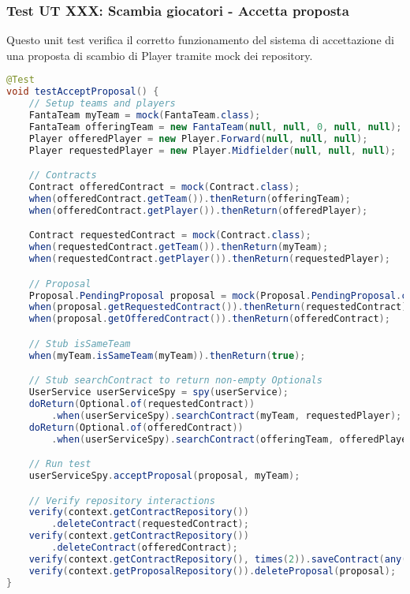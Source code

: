 \subsubsection{Test UT XXX: Scambia giocatori - Accetta proposta} \label{UT13}

Questo unit test verifica il corretto funzionamento del sistema di accettazione di una proposta di scambio di Player 
tramite mock dei repository.

\begin{lstlisting}[language=Java]
@Test
void testAcceptProposal() {
	// Setup teams and players
	FantaTeam myTeam = mock(FantaTeam.class);
	FantaTeam offeringTeam = new FantaTeam(null, null, 0, null, null);
	Player offeredPlayer = new Player.Forward(null, null, null);
	Player requestedPlayer = new Player.Midfielder(null, null, null);

	// Contracts
	Contract offeredContract = mock(Contract.class);
	when(offeredContract.getTeam()).thenReturn(offeringTeam);
	when(offeredContract.getPlayer()).thenReturn(offeredPlayer);

    Contract requestedContract = mock(Contract.class);
    when(requestedContract.getTeam()).thenReturn(myTeam);
	when(requestedContract.getPlayer()).thenReturn(requestedPlayer);

	// Proposal
	Proposal.PendingProposal proposal = mock(Proposal.PendingProposal.class);
	when(proposal.getRequestedContract()).thenReturn(requestedContract);
	when(proposal.getOfferedContract()).thenReturn(offeredContract);

	// Stub isSameTeam
	when(myTeam.isSameTeam(myTeam)).thenReturn(true);

	// Stub searchContract to return non-empty Optionals
	UserService userServiceSpy = spy(userService);
	doReturn(Optional.of(requestedContract))
        .when(userServiceSpy).searchContract(myTeam, requestedPlayer);
	doReturn(Optional.of(offeredContract))
        .when(userServiceSpy).searchContract(offeringTeam, offeredPlayer);

	// Run test
	userServiceSpy.acceptProposal(proposal, myTeam);

	// Verify repository interactions
	verify(context.getContractRepository())
        .deleteContract(requestedContract);
	verify(context.getContractRepository())
        .deleteContract(offeredContract);
	verify(context.getContractRepository(), times(2)).saveContract(any(Contract.class));
	verify(context.getProposalRepository()).deleteProposal(proposal);
}
\end{lstlisting}


